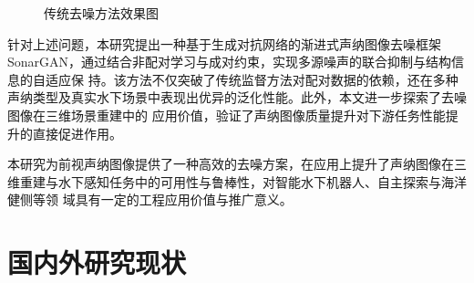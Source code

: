 \begin{figure}[!ht]
  \begin{minipage}{\textwidth}
    \centering
    \hspace{0.5em}
  \end{minipage}

  \caption{传统去噪方法效果图}
  \label{fig:传统去噪方法效果图}
\end{figure}

针对上述问题，本研究提出一种基于生成对抗网络的渐进式声纳图像去噪框架 SonarGAN，通过结合非配对学习与成对约束，实现多源噪声的联合抑制与结构信息的自适应保
持。该方法不仅突破了传统监督方法对配对数据的依赖，还在多种声纳类型及真实水下场景中表现出优异的泛化性能。此外，本文进一步探索了去噪图像在三维场景重建中的
应用价值，验证了声纳图像质量提升对下游任务性能提升的直接促进作用。

本研究为前视声纳图像提供了一种高效的去噪方案，在应用上提升了声纳图像在三维重建与水下感知任务中的可用性与鲁棒性，对智能水下机器人、自主探索与海洋健侧等领
域具有一定的工程应用价值与推广意义。


\section{国内外研究现状}

